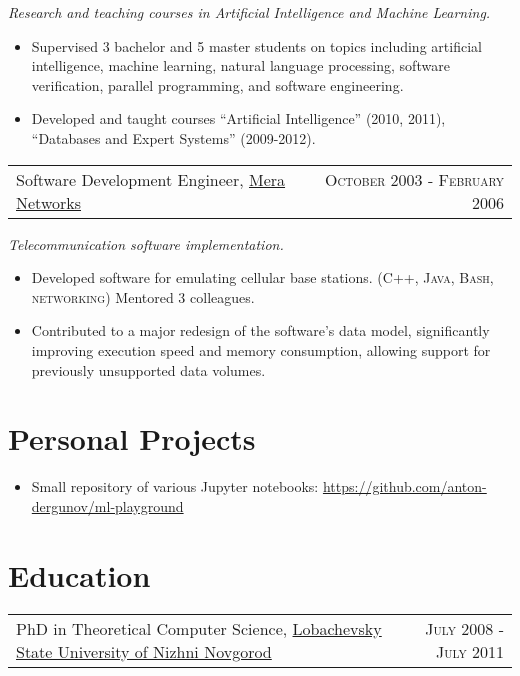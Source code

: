 \documentclass{article}
\makeatletter
\newcommand{\whatwherewhen}[3]{
\noindent\begin{tabular*}{\columnwidth}{@{}@{\extracolsep{\fill}}lr@{}}
#1, #2 & \textsc{#3}
\end{tabular*}}
\newcommand{\smallvskip}{\vskip2mm}
\makeatother
\begin{document}
\textit{Research and teaching courses in Artificial Intelligence and Machine Learning.}

\begin{itemize}

\item Supervised 3 bachelor and 5 master students on topics including artificial intelligence, machine learning, natural language processing, software verification, parallel programming, and software engineering.

\item Developed and taught courses ``Artificial Intelligence'' (2010, 2011), ``Databases and Expert Systems'' (2009-2012).

\end{itemize}


\smallvskip
\whatwherewhen{Software Development Engineer}{\href{http://mera.ru/}{Mera Networks}}{October 2003 - February 2006}

\textit{Telecommunication software implementation.}

\begin{itemize}

\item Developed software for emulating cellular base stations. (\textsc{C++}, \textsc{Java}, \textsc{Bash}, \textsc{networking}) Mentored 3 colleagues.
\item Contributed to a major redesign of the software's data model, significantly improving execution speed and memory consumption, allowing support for previously unsupported data volumes.

\end{itemize}


\section{Personal Projects}

\begin{itemize}
\item Small repository of various Jupyter notebooks: \href{https://github.com/anton-dergunov/ml-playground}{https://github.com/anton-dergunov/ml-playground}
\end{itemize}


\section{Education}

\whatwherewhen{PhD in Theoretical Computer Science}{\href{http://unn.ru}{Lobachevsky State University of Nizhni Novgorod}}{July 2008 - July 2011}
\end{document}
